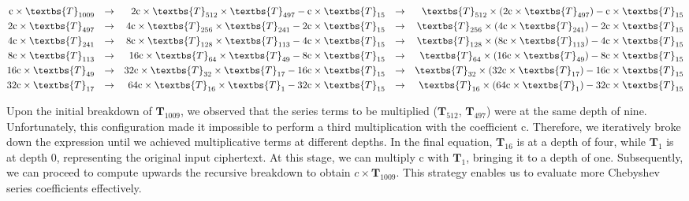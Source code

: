 \documentclass[journal=tosc,final]{iacrtrans}
\begin{document}
\begin{align}
    \text{c}\times\textbs{T}_{1009} && \rightarrow && \text{2c}\times\textbs{T}_{512}\times\textbs{T}_{497}-\text{c}\times\textbs{T}_{15} && \rightarrow &&  \textbs{T}_{512}\times(\text{2c}\times\textbs{T}_{497})-\text{c}\times\textbs{T}_{15}\\
    \text{2c}\times\textbs{T}_{497} && \rightarrow &&  \text{4c}\times\textbs{T}_{256}\times\textbs{T}_{241}-\text{2c}\times\textbs{T}_{15} && \rightarrow  && \textbs{T}_{256}\times(\text{4c}\times\textbs{T}_{241})-\text{2c}\times\textbs{T}_{15}\\
    \text{4c}\times\textbs{T}_{241} && \rightarrow  && \text{8c}\times\textbs{T}_{128}\times\textbs{T}_{113}-\text{4c}\times\textbs{T}_{15} && \rightarrow &&  \textbs{T}_{128}\times(\text{8c}\times\textbs{T}_{113})-\text{4c}\times\textbs{T}_{15}\\
    \text{8c}\times\textbs{T}_{113} && \rightarrow &&  \text{16c}\times\textbs{T}_{64}\times\textbs{T}_{49}-\text{8c}\times\textbs{T}_{15} && \rightarrow &&  \textbs{T}_{64}\times(\text{16c}\times\textbs{T}_{49})-\text{8c}\times\textbs{T}_{15}\\
    \text{16c}\times\textbs{T}_{49} && \rightarrow &&  \text{32c}\times\textbs{T}_{32}\times\textbs{T}_{17}-\text{16c}\times\textbs{T}_{15} && \rightarrow &&  \textbs{T}_{32}\times(\text{32c}\times\textbs{T}_{17})-\text{16c}\times\textbs{T}_{15}\\
    \text{32c}\times\textbs{T}_{17} && \rightarrow &&  \text{64c}\times\textbs{T}_{16}\times\textbs{T}_{1}-\text{32c}\times\textbs{T}_{15} && \rightarrow &&  \textbs{T}_{16}\times(\text{64c}\times\textbs{T}_{1})-\text{32c}\times\textbs{T}_{15}
\end{align}


Upon the initial breakdown of $\textbf{T}_{1009}$, we observed that the series terms to be multiplied ($\textbf{T}_{512}$, $\textbf{T}_{497}$) were at the same depth of nine. Unfortunately, this configuration made it impossible to perform a third multiplication with the coefficient $\text{c}$. Therefore, we iteratively broke down the expression until we achieved multiplicative terms at different depths. In the final equation, $\textbf{T}_{16}$ is at a depth of four, while $\textbf{T}_{1}$ is at depth 0, representing the original input ciphertext. At this stage, we can multiply $\text{c}$ with $\textbf{T}_{1}$, bringing it to a depth of one. Subsequently, we can proceed to compute upwards the recursive breakdown to obtain $c \times \textbf{T}_{1009}$. This strategy enables us to evaluate more Chebyshev series coefficients effectively.
\end{document}
